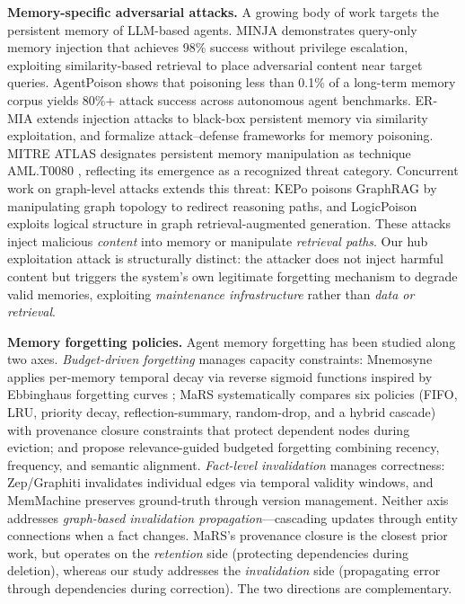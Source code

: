 \documentclass[11pt]{article}
\begin{document}
\textbf{Memory-specific adversarial attacks.}
A growing body of work targets the persistent memory of LLM-based agents.
MINJA \citep{minja_2025} demonstrates query-only memory injection that achieves 98\% success without privilege escalation, exploiting similarity-based retrieval to place adversarial content near target queries.
AgentPoison \citep{agentpoison_2024} shows that poisoning less than 0.1\% of a long-term memory corpus yields 80\%+ attack success across autonomous agent benchmarks.
ER-MIA \citep{ermia_2026} extends injection attacks to black-box persistent memory via similarity exploitation, and \citet{memory_poisoning_2026} formalize attack--defense frameworks for memory poisoning.
MITRE ATLAS designates persistent memory manipulation as technique AML.T0080 \citep{mitre_atlas_2023}, reflecting its emergence as a recognized threat category.
Concurrent work on graph-level attacks extends this threat: KEPo \citep{kepo_2026} poisons GraphRAG by manipulating graph topology to redirect reasoning paths, and LogicPoison \citep{logicpoison_2026} exploits logical structure in graph retrieval-augmented generation.
These attacks inject malicious \textit{content} into memory or manipulate \textit{retrieval paths}.
Our hub exploitation attack is structurally distinct: the attacker does not inject harmful content but triggers the system's own legitimate forgetting mechanism to degrade valid memories, exploiting \textit{maintenance infrastructure} rather than \textit{data or retrieval}.

\textbf{Memory forgetting policies.}
Agent memory forgetting has been studied along two axes.
\textit{Budget-driven forgetting} manages capacity constraints: Mnemosyne \citep{mnemosyne_2025} applies per-memory temporal decay via reverse sigmoid functions inspired by Ebbinghaus forgetting curves \citep{ebbinghaus_1885}; MaRS \citep{mars_2025} systematically compares six policies (FIFO, LRU, priority decay, reflection-summary, random-drop, and a hybrid cascade) with provenance closure constraints that protect dependent nodes during eviction; and \citet{fofadiya_forgetting_2026} propose relevance-guided budgeted forgetting combining recency, frequency, and semantic alignment.
\textit{Fact-level invalidation} manages correctness: Zep/Graphiti \citep{zep_2025} invalidates individual edges via temporal validity windows, and MemMachine \citep{memmachine_2026} preserves ground-truth through version management.
Neither axis addresses \textit{graph-based invalidation propagation}---cascading updates through entity connections when a fact changes.
MaRS's provenance closure is the closest prior work, but operates on the \textit{retention} side (protecting dependencies during deletion), whereas our study addresses the \textit{invalidation} side (propagating error through dependencies during correction).
The two directions are complementary.
\end{document}
